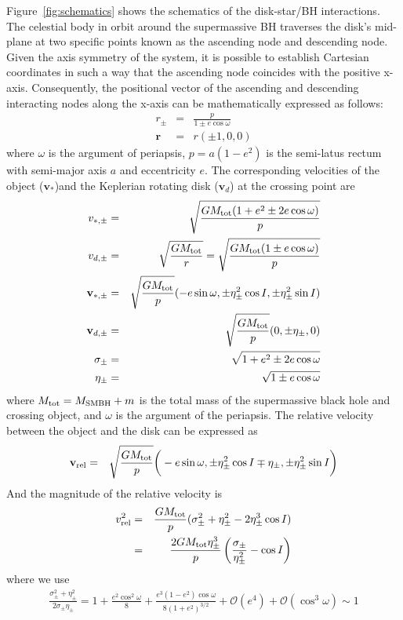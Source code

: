 \documentclass[fleqn,usenatbib]{mnras}
\begin{document}
Figure~\ref{fig:schematics} shows the schematics of the disk-star/BH interactions. The celestial body in orbit around the supermassive BH traverses the disk's mid-plane at two specific points known as the ascending node and descending node. Given the axis symmetry of the system, it is possible to establish Cartesian coordinates in such a way that the ascending node coincides with the positive x-axis. Consequently, the positional vector of the ascending and descending interacting nodes along the x-axis can be mathematically expressed as follows:
\begin{eqnarray}
r_\pm&=&\frac{p}{1\pm e\cos\omega}\\
\mathbf{r}&=&r(\pm1,0,0)
\end{eqnarray}
where {$\omega$ is the argument of periapsis}, $p=a(1-e^2)$ is the semi-latus rectum with semi-major axis $a$ and eccentricity $e$.  The corresponding velocities of the object ($\mathbf{v}_*$)and { the Keplerian rotating disk ($\mathbf{v}_d$)} at the crossing point are
\begin{eqnarray}
v_{*,\pm}&=&\sqrt{\frac{GM_{\rm tot}(1+e^2\pm 2e\cos\omega)}{p}}\\
v_{d,\pm}&=&\sqrt{\frac{GM_{\rm tot}}{r}}=\sqrt{\frac{GM_{\rm tot}(1\pm e\cos\omega)}{p}}\\
\mathbf{v}_{*,\pm} &=& \sqrt{\frac{GM_{\rm tot}}{p}}(-e\sin\omega, \pm\eta_\pm^2\cos I, \pm\eta_\pm^2\sin I)\\
\mathbf{v}_{d,\pm} &=& \sqrt{\frac{GM_{\rm tot}}{p}}(0,\pm\eta_\pm , 0)\\
\sigma_\pm &=& \sqrt{1+e^2\pm2e\cos\omega}\\
\eta_\pm &=& \sqrt{1\pm e\cos\omega}
\end{eqnarray}
where $M_{\rm tot}=M_{\rm SMBH}+m$ is the total mass of the supermassive black hole and crossing object, and $\omega$ is the argument of the periapsis. The relative velocity between the object and the disk can be expressed as
\begin{eqnarray}
\mathbf{v}_{\rm rel}&=&\sqrt{\frac{GM_{\rm tot}}{p}}\bigg(- e\sin\omega,\pm\eta_\pm^2\cos I \mp\eta_\pm,\pm\eta_\pm^2\sin I\bigg) 
\end{eqnarray}
And the magnitude of the relative velocity is
\begin{eqnarray}
v^2_{\rm rel} &=& \frac{GM_{\rm tot}}{p}(\sigma_\pm^2+\eta_\pm^2-2\eta_\pm^3\cos I)\nonumber\\
&=&\frac{2GM_{\rm tot}\eta_\pm^3}{p}\left(\frac{\sigma_\pm}{\eta_\pm^2}-\cos I\right)
\end{eqnarray}
where we use 
\begin{eqnarray}
\frac{\sigma_\pm^2+\eta_\pm^2}{2\sigma_\pm\eta_\pm}=1+\frac{e^2\cos^2\omega}{8}+\frac{e^3(1-e^2)\cos\omega}{8(1+e^2)^{3/2}}+\mathcal{O}(e^4)+\mathcal{O}(\cos^3\omega)\sim1
\end{eqnarray}
\end{document}
